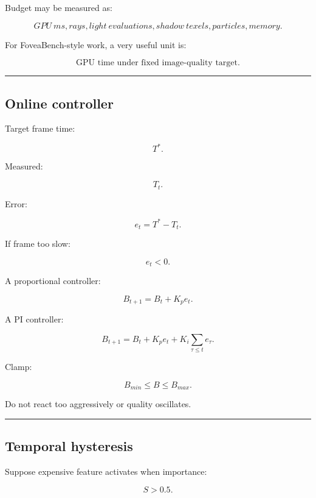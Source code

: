 Budget may be measured as:

\[
GPU\ ms,
rays,
light\ evaluations,
shadow\ texels,
particles,
memory.
\]

For FoveaBench-style work, a very useful unit is:

\[
\boxed{
\text{GPU time under fixed image-quality target}.
}
\]

\begin{center}\rule{0.5\linewidth}{0.5pt}\end{center}

\subsection{Online controller}\label{04-visual-computing-ii-ch040-online-controller}

\hypertarget{04-visual-computing-ii-ch040-online-controller}{}

Target frame time:

\[
T^*.
\]

Measured:

\[
T_t.
\]

Error:

\[
e_t=
T^*-T_t.
\]

If frame too slow:

\[
e_t<0.
\]

A proportional controller:

\[
B_{t+1}
=
B_t
+
K_p e_t.
\]

A PI controller:

\[
\boxed{
B_{t+1}
=
B_t
+
K_p e_t
+
K_i\sum_{\tau\le t}e_\tau.
}
\]

Clamp:

\[
B_{min}\le B\le B_{max}.
\]

Do not react too aggressively or quality oscillates.

\begin{center}\rule{0.5\linewidth}{0.5pt}\end{center}

\subsection{Temporal hysteresis}\label{04-visual-computing-ii-ch040-temporal-hysteresis}

\hypertarget{04-visual-computing-ii-ch040-temporal-hysteresis}{}

Suppose expensive feature activates when importance:

\[
S>0.5.
\]

